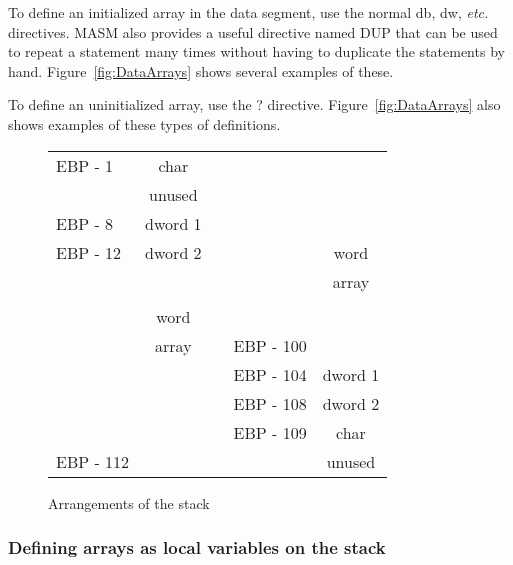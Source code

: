 To define an initialized array in the {\code data} segment, use the
normal {\code db}, {\code dw}, \emph{etc.} 
directives. MASM also provides a useful directive
named {\code DUP}  that can be used to repeat a statement many times
without having to duplicate the statements by hand.
Figure~\ref{fig:DataArrays} shows several examples of these.

To define an uninitialized array, use the
{\code ?} 
directive. Figure~\ref{fig:DataArrays} also shows examples of these
types of definitions.

\begin{figure}[t]
\centering
\begin{tabular}{l|c|ll|c|}
\cline{2-2} \cline{5-5}
EBP - 1  & char    & \hspace{2em} &           & \\
\cline{2-2}
         & unused  &              &           & \\
\cline{2-2}
EBP - 8  & dword 1 &              &           & \\
\cline{2-2}
EBP - 12 & dword 2 &              &           & word \\
\cline{2-2}
         &         &              &           & array \\
         &         &              &           & \\
         & word    &              &           & \\
         & array   &              & EBP - 100 & \\
\cline{5-5}
         &         &              & EBP - 104 & dword 1 \\
\cline{5-5}
         &         &              & EBP - 108 & dword 2 \\
\cline{5-5}
         &         &              & EBP - 109 & char \\
\cline{5-5}
EBP - 112 &        &              &           & unused \\
\cline{2-2} \cline{5-5}
\end{tabular}
\caption{Arrangements of the stack\label{fig:StackLayouts}}
\end{figure}

\subsubsection{Defining arrays as local variables on the stack}

